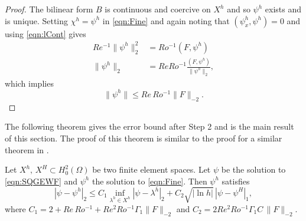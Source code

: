 \begin{proof}
  The bilinear form $B$ is continuous and coercive on $X^h$ and so $\psi^h$
  exists and is unique. Setting $\chi^h=\psi^h$ in \eqref{eqn:Fine} and again
  noting that $(\psi_x^h,\psi^h)=0$ and using \eqref{eqn:lCont} gives
  \begin{align*}
    Re^{-1} \|\psi^h\|_2^2 &= Ro^{-1} (F,\psi^h) \\
    \|\psi^h\|_2 &= Re Ro^{-1} \frac{(F,\psi^h)}{\|\psi^h\|_2},
  \end{align*}
  which implies
  \begin{equation*}
    \|\psi^h\| \le Re\, Ro^{-1} \|F\|_{-2}.
  \end{equation*}
\end{proof}

The following theorem gives the error bound after Step 2 and is the main result
of this section. The proof of this theorem is similar to the proof for a similar
theorem in \cite{Fairag98}.
\begin{thm} \label{thm:2LTwoLevel}
  Let $X^h,\, X^H\subset H^2_0(\Omega)$ be two finite element spaces. Let $\psi$ be
  the solution to \eqref{eqn:SQGEWF} and $\psi^h$ the solution to
  \eqref{eqn:Fine}. Then $\psi^h$ satisfies
  \begin{equation}
    |\psi-\psi^h|_2 \le C_1 \inf_{\lambda^h\in X^h} |\psi-\lambda^h|_2 + C_2
      \sqrt{|\ln h|}\, |\psi - \psi^H|_1,
    \label{eqn:Error}
  \end{equation}
  where $C_1 = 2 + Re\,Ro^{-1} + Re^2 Ro^{-1} \Gamma_1 \|F\|_{-2}$ and $C_2= 2
  Re^2 Ro^{-1} \Gamma_1 C\,\|F\|_{-2}$.
\end{thm}

